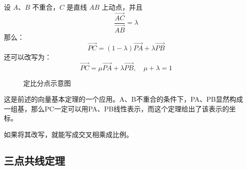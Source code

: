 \begin{theorem}[定比分点]
    \begin{minipage}[t]{0.55\textwidth}
        设 $A$、$B$ 不重合，$C$ 是直线 $AB$ 上动点，并且
        $$
            \frac{\overrightarrow{AC}}{\overrightarrow{AB}} = \lambda
        $$
        那么：
        $$
            \overrightarrow{PC} = (1-\lambda) \overrightarrow{PA} + \lambda \overrightarrow{PB}
        $$
        还可以改写为：
        $$
            \overrightarrow{PC} = \mu \overrightarrow{PA} + \lambda \overrightarrow{PB}, \quad \mu + \lambda = 1
        $$
    \end{minipage}
    \begin{minipage}[t]{0.4\textwidth}
        \begin{figure}[H]
            \centering
            \caption{定比分点示意图}
        \end{figure}
    \end{minipage}

    这是前述的向量基本定理的一个应用。A、B不重合的条件下，PA、PB显然构成一组基，那么PC一定可以用PA、PB线性表示，而这个定理给出了该表示的坐标。

    \begin{tips}
        如果将其改写，就能写成交叉相乘成比例。
    \end{tips}
\end{theorem}

\subsection{三点共线定理}

